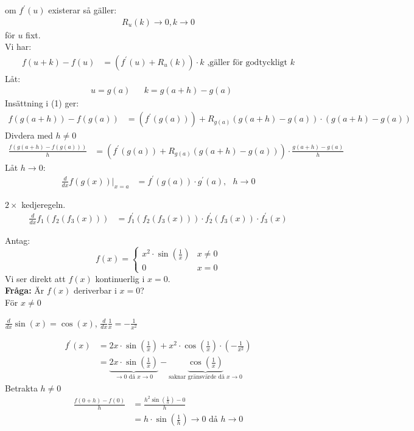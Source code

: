 om $f^\prime(u)$ existerar så gäller:
\begin{align*}
    R_u(k) \to 0, k \to 0
\end{align*}
för $u$ fixt.\\
Vi har:
\begin{align}
    f(u + k) - f(u) &= (f^\prime(u) + R_u(k)) \cdot k \mbox{ ,gäller för godtyckligt }k
\end{align}
Låt:
\begin{align*}
    &u = g(a)
    &&k= g(a + h) - g(a)
\end{align*}
Insättning i (1) ger:
\begin{align*}
    f(g(a+h)) - f(g(a)) &= (f^\prime(g(a))) + R_{g(a)}(g(a+h)-g(a)) \cdot (g(a+h)-g(a))
\end{align*}
Divdera med $h\neq 0$
\begin{align*}
    \frac{f(g(a+h)-f(g(a)))}{h} &= (f^\prime(g(a)) + R_{g(a)}(g(a+h)-g(a))) \cdot \frac{g(a+h)-g(a)}{h}
\end{align*}
Låt $h \to 0$:
\begin{align*}
    \frac{d}{dx}f(g(x))|_{x=a} &= f^\prime(g(a)) \cdot g^\prime(a), \mbox{ } h \to 0 
\end{align*}
\begin{Ex}
    $2 \times$ kedjeregeln.
    \begin{align*}
        \frac{d}{dx}f_1(f_2(f_3(x))) &= f^\prime_1(f_2(f_3(x))) \cdot f^\prime_2(f_3(x)) \cdot f^\prime_3(x)
    \end{align*}
\end{Ex}
\begin{Ex}
    Antag:
    \[
    f(x) = 
    \begin{cases}
        x^2 \cdot \sin(\frac{1}{x}) & x \neq 0\\
        0 & x = 0
    \end{cases}
    \]
    Vi ser direkt att $f(x)$ kontinuerlig i $x = 0$. \\
    \textbf{Fråga: } Är $f(x)$ deriverbar i $x=0$?\\
    För $x \neq 0$
    \begin{Rem}
        $\frac{d}{dx}\sin(x) = \cos(x)$, $\frac{d}{dx}\frac{1}{x} = - \frac{1}{x^2}$
    \end{Rem}
    \begin{align*}
        f^\prime(x) &= 2x \cdot \sin(\frac{1}{x}) + x^2 \cdot \cos(\frac{1}{x}) \cdot (- \frac{1}{x^2})\\
        &= \underbrace{2x \cdot \sin(\frac{1}{x})}_{\to 0 \mbox{ då } x\to 0} - \underbrace{\cos(\frac{1}{x})}_{\mbox{saknar gränsvärde då } x \to 0}
    \end{align*}
    Betrakta $h \neq 0$
    \begin{align*}
        \frac{f(0 + h)-f(0)}{h} &= \frac{h^2\sin(\frac{1}{h})-0}{h}\\
        &= h \cdot \sin(\frac{1}{h}) \to 0 \mbox{ då } h \to 0
    \end{align*}
\end{Ex}
